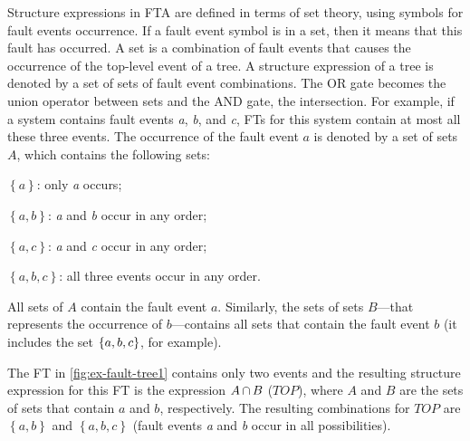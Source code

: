 \documentclass[12pt,openright,twoside,a4paper,oldfontcommands,english,brazil,final]{abntex2}
\theoremstyle{theo}
\newcommand{\setsin}[1]{\ensuremath\left\{ #1 \right\}}
\def\inter{\ensuremath\operatorname{\cap}}
\begin{document}
Structure expressions in \ac{FTA} are defined in terms of set theory, using symbols for fault events occurrence.
If a fault event symbol is in a set, then it means that this fault has occurred.
A set is a combination of fault events that causes the occurrence of the top-level event of a tree.
A structure expression of a tree is denoted by a set of sets of fault event combinations.
The \ac{OR} gate becomes the union operator between sets and the \ac{AND} gate, the intersection.
For example, if a system contains fault events \emph{a}, \emph{b}, and \emph{c}, \aclp{FT} for this system contain at most all these three events.
The occurrence of the fault event $a$ is denoted by a set of sets $A$, which contains the following sets:
%
\begin{alineas}
  \item\label{item:fta-only-a-occurs} $\left\{a\right\}$: only \emph{a} occurs;
  \item\label{item:fta-a-and-b-occur} $\left\{a,b\right\}$: \emph{a} and \emph{b} occur in any order;
  \item\label{item:fta-a-and-c-occur} $\left\{a,c\right\}$: \emph{a} and \emph{c} occur in any order;
  \item\label{item:fta-all-occur} $\left\{a,b,c\right\}$: all three events occur in any order.
\end{alineas}
All sets of $A$ contain the fault event $a$.
Similarly, the sets of sets $B$---that represents the occurrence of $b$---contains all sets that contain the fault event $b$ (it includes the set $\setsin{a,b,c}$, for example).
%

The \acl{FT} in \cref{fig:ex-fault-tree1} contains only two events and the resulting structure expression for this \ac{FT} is the expression $A \inter B$ ($TOP$), where $A$ and $B$ are the sets of sets that contain $a$ and $b$, respectively.
The resulting combinations for $TOP$ are $\left\{a,b\right\}$ and $\left\{a,b,c\right\}$ (fault events \emph{a} and \emph{b} occur in all possibilities).
\end{document}
